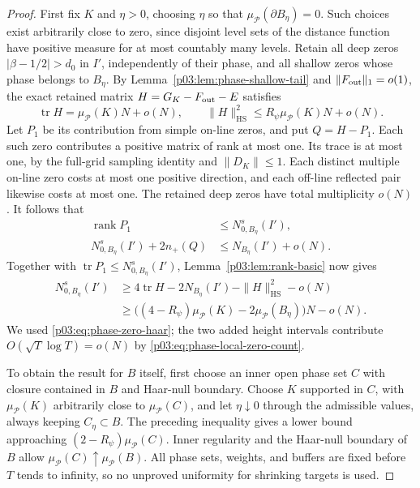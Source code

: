 \documentclass[11pt,letterpaper]{article}
\theoremstyle{definition}
\theoremstyle{remark}
\newcommand{\1}{\mathbf 1}
\begin{document}
\begin{proof}
First fix $K$ and $\eta>0$, choosing $\eta$ so that
$\mu_{\mathcal P}(\partial B_\eta)=0$.  Such choices exist
arbitrarily close to zero, since disjoint level sets of the distance
function have positive measure for at most countably many levels.
Retain all deep zeros $|\beta-1/2|>d_0$ in $I'$, independently of
their phase, and all shallow zeros whose phase belongs to $B_\eta$.
By Lemma~\ref{p03:lem:phase-shallow-tail} and
$\|F_{\rm out}\|_1=o(1)$, the exact retained matrix
$H=G_K-F_{\rm out}-E$ satisfies
\[
 \operatorname{tr}H=\mu_{\mathcal P}(K)N+o(N),\qquad
 \|H\|_{\mathrm{HS}}^2
 \le R_\psi\mu_{\mathcal P}(K)N+o(N).
\]
Let $P_1$ be its contribution from simple on-line zeros, and put
$Q=H-P_1$.  Each such zero contributes a positive matrix of rank at
most one.  Its trace is at most one, by the full-grid sampling
identity and $\|D_K\|\le1$.  Each distinct multiple on-line zero
costs at most one positive direction, and each off-line reflected
pair likewise costs at most one.  The retained deep zeros have total
multiplicity $o(N)$.  It follows that
\begin{align*}
 \operatorname{rank}P_1
 &\le N^s_{0,B_\eta}(I'),\\
 N^s_{0,B_\eta}(I')+2n_+(Q)
 &\le N_{B_\eta}(I')+o(N).
\end{align*}
Together with $\operatorname{tr}P_1\le N^s_{0,B_\eta}(I')$,
Lemma~\ref{p03:lem:rank-basic} now gives
\begin{align*}
 N^s_{0,B_\eta}(I')
 &\ge 4\operatorname{tr}H
       -2N_{B_\eta}(I')-\|H\|_{\mathrm{HS}}^2-o(N)\\
 &\ge \bigl((4-R_\psi)\mu_{\mathcal P}(K)
             -2\mu_{\mathcal P}(B_\eta)\bigr)N-o(N).
\end{align*}
We used \eqref{p03:eq:phase-zero-haar}; the two added height intervals
contribute $O(\sqrt T\log T)=o(N)$ by
\eqref{p03:eq:phase-local-zero-count}.

To obtain the result for $B$ itself, first choose an inner open phase
set $C$ with closure contained in $B$ and Haar-null boundary.  Choose
$K$ supported in $C$, with $\mu_{\mathcal P}(K)$ arbitrarily close
to $\mu_{\mathcal P}(C)$, and let $\eta\downarrow0$ through the
admissible values, always keeping $C_\eta\subset B$.  The preceding
inequality gives a lower bound approaching
$(2-R_\psi)\mu_{\mathcal P}(C)$.  Inner regularity and the
Haar-null boundary of $B$ allow
$\mu_{\mathcal P}(C)\uparrow\mu_{\mathcal P}(B)$.
All phase sets, weights, and buffers are fixed before $T$ tends to
infinity, so no unproved uniformity for shrinking targets is used.
\end{proof}
\end{document}

